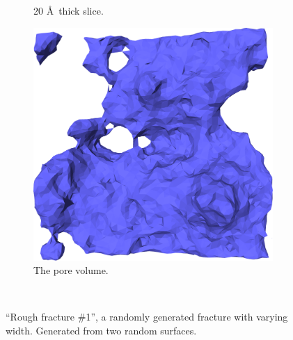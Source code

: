 \begin{figure}[!p]
{\begin{subfigure}[t]{\myfigwidth}
            \caption{20 \AA\ thick slice.}%
        \end{subfigure}%
        \hspace{\myhfillwidth}%
        \begin{subfigure}[t]{\myfigwidth}%
            \centering%
            \includegraphics[width=\textwidth]{images/systems/trimmed-rough_fracture01_abel_22}%
            \caption{The pore volume.}%
        \end{subfigure}%
    }%
    \vspace{10pt}\\%
    \caption{%
        ``Rough fracture \#1'', a randomly generated fracture with varying width. Generated from two random surfaces.%
        \label{fig:renderings_rough_fracture01_abel}%
    }%
\end{figure}%


